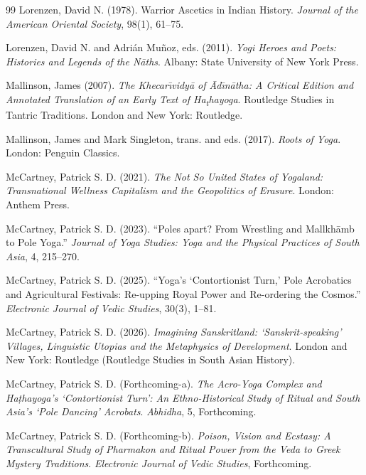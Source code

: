 \documentclass[11pt,twoside,letterpaper]{article}
\begin{document}
\begin{thebibliography}{99}
Lorenzen, David N. (1978). Warrior Ascetics in Indian History. \textit{Journal of the American Oriental Society}, 98(1), 61--75.

Lorenzen, David N. and Adrián Muñoz, eds. (2011). \textit{Yogi Heroes and Poets: Histories and Legends of the Nāths}. Albany: State University of New York Press.

Mallinson, James (2007). \textit{The Khecar\={\i}vidy\={a} of \={A}d\={\i}n\={a}tha: A Critical Edition and Annotated Translation of an Early Text of Ha\textsubscript{t}hayoga}. Routledge Studies in Tantric Traditions. London and New York: Routledge.

Mallinson, James and Mark Singleton, trans. and eds. (2017). \textit{Roots of Yoga}. London: Penguin Classics.

McCartney, Patrick S. D. (2021). \textit{The Not So United States of Yogaland: Transnational Wellness Capitalism and the Geopolitics of Erasure}. London: Anthem Press.

McCartney, Patrick S. D. (2023). ``Poles apart? From Wrestling and Mallkhāmb to Pole Yoga.'' \textit{Journal of Yoga Studies: Yoga and the Physical Practices of South Asia}, 4, 215–270.

McCartney, Patrick S. D. (2025). ``Yoga's `Contortionist Turn,' Pole Acrobatics and Agricultural Festivals: Re-upping Royal Power and Re-ordering the Cosmos.'' \textit{Electronic Journal of Vedic Studies}, 30(3), 1--81.

McCartney, Patrick S. D. (2026). \textit{Imagining Sanskritland: `Sanskrit-speaking' Villages, Linguistic Utopias and the Metaphysics of Development}. London and New York: Routledge (Routledge Studies in South Asian History).

McCartney, Patrick S. D. (Forthcoming-a). \textit{The Acro-Yoga Complex and Ha\d{t}hayoga's `Contortionist Turn': An Ethno-Historical Study of Ritual and South Asia's `Pole Dancing' Acrobats}. \textit{Abhidha}, 5, Forthcoming.

McCartney, Patrick S. D. (Forthcoming-b). \textit{Poison, Vision and Ecstasy: A Transcultural Study of Pharmakon and Ritual Power from the Veda to Greek Mystery Traditions}. \textit{Electronic Journal of Vedic Studies}, Forthcoming.


\end{thebibliography}
\end{document}
